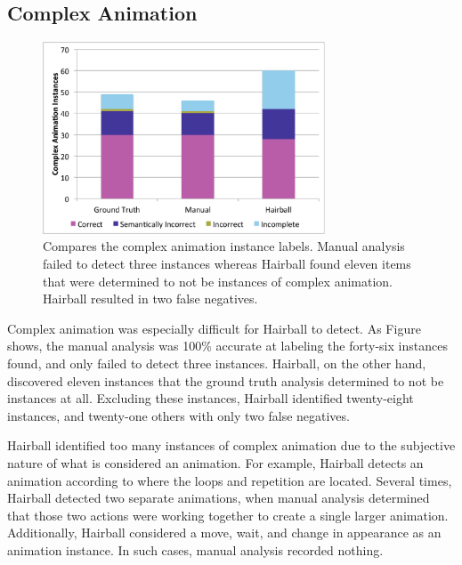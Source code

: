 \subsection{Complex Animation}

\begin{figure}[!t]
\centering \includegraphics[trim=.3in .15in .3in .15in, clip,
  width=3.3in]{graphs/AutoAnimation.eps}
\caption{Compares the complex animation instance labels. Manual analysis failed
  to detect three instances whereas Hairball found eleven items that were
  determined to not be instances of complex animation. Hairball resulted in two
  false negatives.}
\end{figure}

Complex animation was especially difficult for Hairball to detect.  As
Figure~ shows, the manual analysis was 100\% accurate
at labeling the forty-six instances found, and only failed to detect three
instances. Hairball, on the other hand, discovered eleven \incom{} instances
that the ground truth analysis determined to not be instances at all. Excluding
these instances, Hairball identified twenty-eight \correct{} instances, and
twenty-one others with only two false negatives.

Hairball identified too many instances of complex animation due to the
subjective nature of what is considered an animation.  For example, Hairball
detects an animation according to where the loops and repetition are
located. Several times, Hairball detected two separate animations, when manual
analysis determined that those two actions were working together to create a
single larger animation. Additionally, Hairball considered a move, wait, and
change in appearance as an \incom{} animation instance. In such cases, manual
analysis recorded nothing.

